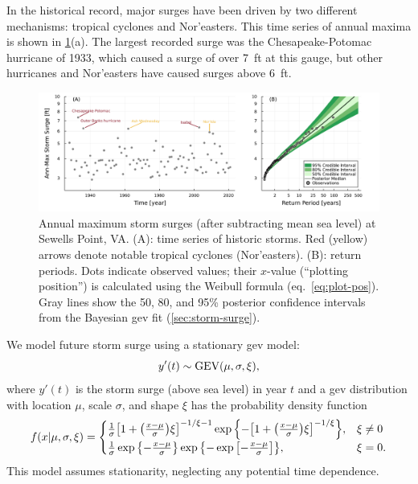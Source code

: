 \documentclass[12pt]{article}
\begin{document}
In the historical record, major surges have been driven by two different mechanisms: tropical cyclones and Nor'easters.
This time series of annual maxima is shown in \cref{fig:surge-obs-return}(a).
The largest recorded surge was the Chesapeake-Potomac hurricane of 1933, which caused a surge of over \SI{7}{ft} at this gauge, but other hurricanes and Nor'easters have caused surges above \SI{6}{ft}.

\begin{figure}
    \centering
    \includegraphics[width=\textwidth]{surge-obs-return}
    \caption{
        Annual maximum storm surges (after subtracting mean sea level) at Sewells Point, VA.
        (A):
        time series of historic storms.
        Red (yellow) arrows denote notable tropical cyclones (Nor'easters).
        (B):
        return periods.
        Dots indicate observed values; their $x$-value (``plotting position'') is calculated using the Weibull formula (eq.~\ref{eq:plot-pos}).
        Gray lines show the 50, 80, and 95\% posterior confidence intervals from the Bayesian \gls{gev} fit (\cref{sec:storm-surge}).
    }\label{fig:surge-obs-return}
\end{figure}

We model future storm surge using a stationary \gls{gev} model:
\begin{equation}\label{eq:surge-model}
    y'(t) \sim \text{GEV}\qty(\mu, \sigma, \xi),
\end{equation}
where $y'(t)$ is the storm surge (above sea level) in year $t$ and a \gls{gev} distribution with location $\mu$, scale $\sigma$, and shape $\xi$ has the probability density function
\begin{equation*}
    f(x | \mu, \sigma, \xi)= \begin{cases}
        \frac{1}{\sigma} \qty[ 1 + \qty( \frac{x-\mu}{\sigma} ) \xi ]^{-1 / \xi - 1} \exp \qty{- \qty[1+\qty(\frac{x-\mu}{\sigma}) \xi ]^{-1 / \xi} }, & \xi \neq 0 \\
        \frac{1}{\sigma} \exp \qty{-\frac{x-\mu}{\sigma}} \exp \qty{ -\exp \qty[-\frac{x-\mu}{\sigma}]},                                               & \xi=0.
    \end{cases}
\end{equation*}
This model assumes stationarity, neglecting any potential time dependence.
\end{document}
